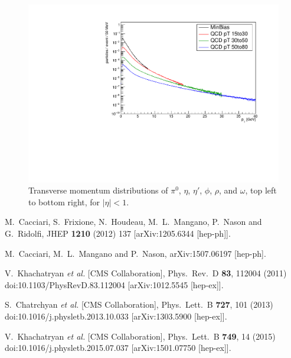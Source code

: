 \documentclass[12pt]{article}
\begin{document}
\begin{figure}
  \includegraphics[width=0.48\linewidth]{plots/h_omega.pdf}
  \caption{\protect Transverse momentum distributions of 
$\pi^0$, $\eta$, $\eta'$, $\phi$, $\rho$, and $\omega$, top left
to bottom right, for $|\eta| < 1$.}
\label{fig:mesons}
\end{figure}


\clearpage
\begin{thebibliography}{1}

  M.~Cacciari, S.~Frixione, N.~Houdeau, M.~L.~Mangano, P.~Nason and G.~Ridolfi,
  JHEP {\bf 1210} (2012) 137 [arXiv:1205.6344 [hep-ph]].

  M.~Cacciari, M.~L.~Mangano and P.~Nason,
  arXiv:1507.06197 [hep-ph].

  V.~Khachatryan {\it et al.} [CMS Collaboration],
  Phys.\ Rev.\ D {\bf 83}, 112004 (2011)
  doi:10.1103/PhysRevD.83.112004
  [arXiv:1012.5545 [hep-ex]].

  S.~Chatrchyan {\it et al.} [CMS Collaboration],
  Phys.\ Lett.\ B {\bf 727}, 101 (2013)
  doi:10.1016/j.physletb.2013.10.033
  [arXiv:1303.5900 [hep-ex]].

  V.~Khachatryan {\it et al.} [CMS Collaboration],
  Phys.\ Lett.\ B {\bf 749}, 14 (2015)
  doi:10.1016/j.physletb.2015.07.037
  [arXiv:1501.07750 [hep-ex]].



\end{thebibliography}
\end{document}
